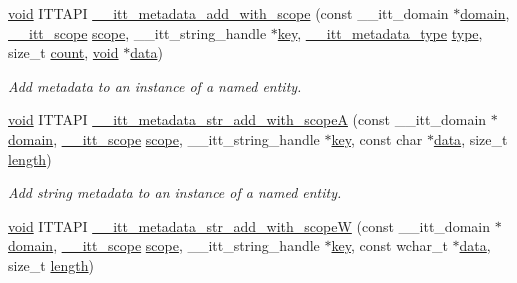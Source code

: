 \begin{DoxyCompactItemize}
\item 
\hyperlink{ittnotify__static_8h_af941d56e55e3c5465135b60c4d6343ed}{void} I\-T\-T\-A\-P\-I \hyperlink{group__metadata_ga281377e05c2aaa34124be44d4f32d6aa}{\-\_\-\-\_\-itt\-\_\-metadata\-\_\-add\-\_\-with\-\_\-scope} (const \-\_\-\-\_\-itt\-\_\-domain $\ast$\hyperlink{ittnotify__static_8h_ae4bc3459cfd348603d57d87ede15591b}{domain}, \hyperlink{group__markers_ga9712c6a992a435d4d134e7164f609f04}{\-\_\-\-\_\-itt\-\_\-scope} \hyperlink{ittnotify__static_8h_a0fd38e6d524143379caa686304561d5b}{scope}, \-\_\-\-\_\-itt\-\_\-string\-\_\-handle $\ast$\hyperlink{ittnotify__static_8h_af4f22e9c530f1bf5618220b2627b8f02}{key}, \hyperlink{group__metadata_ga906320efadd24c37fc2ee021e880a673}{\-\_\-\-\_\-itt\-\_\-metadata\-\_\-type} \hyperlink{ittnotify__static_8h_ad66c62ad96ed5fc5b56ae47779013f23}{type}, size\-\_\-t \hyperlink{ittnotify__static_8h_a9da14338c9c3be6f21c41cf4ec79eaf1}{count}, \hyperlink{ittnotify__static_8h_af941d56e55e3c5465135b60c4d6343ed}{void} $\ast$\hyperlink{ittnotify__static_8h_ae4b7aa9cddc8e1ade7c67ed7e338b18f}{data})
\begin{DoxyCompactList}\small\item\em Add metadata to an instance of a named entity. \end{DoxyCompactList}\item 
\hyperlink{ittnotify__static_8h_af941d56e55e3c5465135b60c4d6343ed}{void} I\-T\-T\-A\-P\-I \hyperlink{group__metadata_ga4c53d5ec2eebfd017f3867239750a0ec}{\-\_\-\-\_\-itt\-\_\-metadata\-\_\-str\-\_\-add\-\_\-with\-\_\-scope\-A} (const \-\_\-\-\_\-itt\-\_\-domain $\ast$\hyperlink{ittnotify__static_8h_ae4bc3459cfd348603d57d87ede15591b}{domain}, \hyperlink{group__markers_ga9712c6a992a435d4d134e7164f609f04}{\-\_\-\-\_\-itt\-\_\-scope} \hyperlink{ittnotify__static_8h_a0fd38e6d524143379caa686304561d5b}{scope}, \-\_\-\-\_\-itt\-\_\-string\-\_\-handle $\ast$\hyperlink{ittnotify__static_8h_af4f22e9c530f1bf5618220b2627b8f02}{key}, const char $\ast$\hyperlink{ittnotify__static_8h_ae4b7aa9cddc8e1ade7c67ed7e338b18f}{data}, size\-\_\-t \hyperlink{ittnotify__static_8h_ac53a0c6bfc9a2eca64ad3e517d9d6b0b}{length})
\begin{DoxyCompactList}\small\item\em Add string metadata to an instance of a named entity. \end{DoxyCompactList}\item 
\hyperlink{ittnotify__static_8h_af941d56e55e3c5465135b60c4d6343ed}{void} I\-T\-T\-A\-P\-I \hyperlink{group__metadata_ga2bd3d1d2de57df7483d7d5b8324e23e0}{\-\_\-\-\_\-itt\-\_\-metadata\-\_\-str\-\_\-add\-\_\-with\-\_\-scope\-W} (const \-\_\-\-\_\-itt\-\_\-domain $\ast$\hyperlink{ittnotify__static_8h_ae4bc3459cfd348603d57d87ede15591b}{domain}, \hyperlink{group__markers_ga9712c6a992a435d4d134e7164f609f04}{\-\_\-\-\_\-itt\-\_\-scope} \hyperlink{ittnotify__static_8h_a0fd38e6d524143379caa686304561d5b}{scope}, \-\_\-\-\_\-itt\-\_\-string\-\_\-handle $\ast$\hyperlink{ittnotify__static_8h_af4f22e9c530f1bf5618220b2627b8f02}{key}, const wchar\-\_\-t $\ast$\hyperlink{ittnotify__static_8h_ae4b7aa9cddc8e1ade7c67ed7e338b18f}{data}, size\-\_\-t \hyperlink{ittnotify__static_8h_ac53a0c6bfc9a2eca64ad3e517d9d6b0b}{length})
\end{DoxyCompactItemize}


